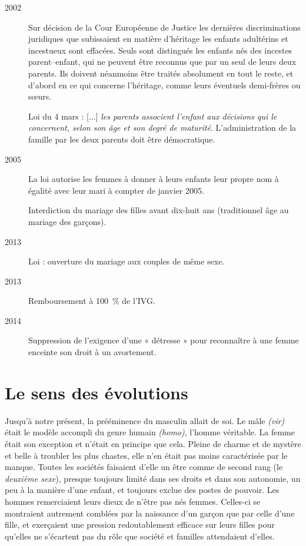 \begin{description}
\item[2002] Sur décision de la Cour Européenne de Justice les dernières discriminations juridiques que subissaient en matière d'héritage les enfants adultérins et incestueux sont effacées. Seuls sont distingués les enfants nés des incestes parent--enfant, qui ne peuvent être reconnus que par un seul de leurs deux parents. Ils doivent néanmoins être traités absolument en tout le reste, et d'abord en ce qui concerne l'héritage, comme leurs éventuels demi-frères ou sœurs. 

Loi du 4 mars : {[...] \emph{les parents associent l'enfant aux décisions qui le concernent, selon son âge et son degré de maturité}}. L'administration de la famille par les deux parents doit être démocratique.

\item[2005] La loi autorise les femmes à donner à leurs enfants leur propre nom à égalité avec leur mari à compter de janvier 2005. 

Interdiction du mariage des filles avant dix-huit ans (traditionnel âge au mariage des garçons).

\item[2013] Loi  : ouverture du mariage aux couples de même sexe.

\item[2013] Remboursement à 100~\% de l'IVG.

\item[2014] Suppression de l'exigence d'une « détresse » pour reconnaître à une femme enceinte son droit à un avortement. 
\end{description}
 
 
\section{Le sens des évolutions}

 Jusqu'à notre présent, la prééminence du masculin allait de soi. Le mâle \emph{(vir)} était le modèle accompli du genre humain \emph{(homo)}, l'homme véritable. La femme était son exception et n'était en principe que cela. Pleine de charme et de mystère et belle à troubler les plus chastes, elle n'en était pas moins caractérisée par le manque. Toutes les sociétés faisaient d'elle un être comme de second rang (le {\emph{deuxième sexe}}), presque toujours limité dans ses droits et dans son autonomie, un peu à la manière d'une enfant, et toujours exclue des postes de pouvoir. Les hommes remerciaient leurs dieux de n'être pas nés femmes. Celles-ci se montraient autrement comblées par la naissance d'un garçon que par celle d'une fille, et exerçaient une pression redoutablement efficace sur leurs filles pour qu'elles ne s'écartent pas du rôle que société et familles attendaient d'elles.

